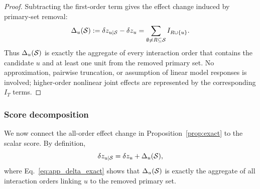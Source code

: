 \begin{proof}
Subtracting the first-order term gives the effect change induced by
primary-set removal:
\begin{equation}
\Delta_u(\mathcal{S})
:=
\delta z_{u\mid\mathcal{S}}-\delta z_u
=
\sum_{\emptyset\neq R\subseteq\mathcal{S}}
I_{R\cup\{u\}} .
\label{eq:app_delta_exact}
\end{equation}
Thus $\Delta_u(\mathcal{S})$ is exactly the aggregate of every interaction order
that contains the candidate $u$ and at least one unit from the removed primary
set.
No approximation, pairwise truncation, or assumption of linear model
responses is involved; higher-order nonlinear joint effects are represented
by the corresponding $I_T$ terms.
\end{proof}

\subsubsection{Score decomposition}

We now connect the all-order effect change in Proposition~\ref{prop:exact} to the scalar \coax score. By definition,
\begin{equation}
\delta z_{u\mid\mathcal{S}}=\delta z_u+\Delta_u(\mathcal{S}),
\label{eq:app_effect_change_identity}
\end{equation}
where Eq.~\ref{eq:app_delta_exact} shows that $\Delta_u(\mathcal{S})$ is exactly the aggregate of all interaction orders linking $u$ to the removed primary set.

